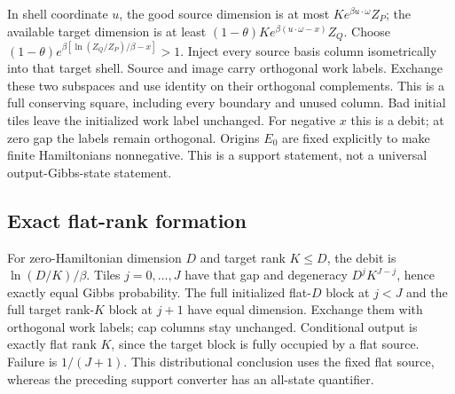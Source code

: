 \documentclass[11pt]{article}
\theoremstyle{definition}
\theoremstyle{remark}
\begin{document}
In shell coordinate \(u\), the good source dimension is at most
\(K e^{\beta u\cdot\omega}Z_P\); the available target dimension is at least
\((1-\theta)K e^{\beta(u\cdot\omega-x)}Z_Q\).
Choose \((1-\theta)e^{\beta[\ln(Z_Q/Z_P)/\beta-x]}>1\).
Inject every source basis column isometrically into that target shell.
Source and image carry orthogonal work labels. Exchange these two
subspaces and use identity on their orthogonal complements. This is
a full conserving square, including every boundary and unused column.
Bad initial tiles leave the initialized work label unchanged.
For negative \(x\) this is a debit; at zero gap the labels remain
orthogonal. Origins \(E_0\) are fixed explicitly to make finite
Hamiltonians nonnegative. This is a support statement, not a universal
output-Gibbs-state statement.

\subsection*{Exact flat-rank formation}
For zero-Hamiltonian dimension \(D\) and target rank \(K\le D\), the debit is
\(\ln(D/K)/\beta\). Tiles \(j=0,\ldots,J\) have that gap and degeneracy
\(D^jK^{J-j}\), hence exactly equal Gibbs probability.
The full initialized flat-\(D\) block at \(j<J\) and the full target
rank-\(K\) block at \(j+1\) have equal dimension. Exchange them with
orthogonal work labels; cap columns stay unchanged. Conditional output
is exactly flat rank \(K\), since the target block is fully occupied
by a flat source. Failure is \(1/(J+1)\).
This distributional conclusion uses the fixed flat source, whereas
the preceding support converter has an all-state quantifier.
\end{document}
